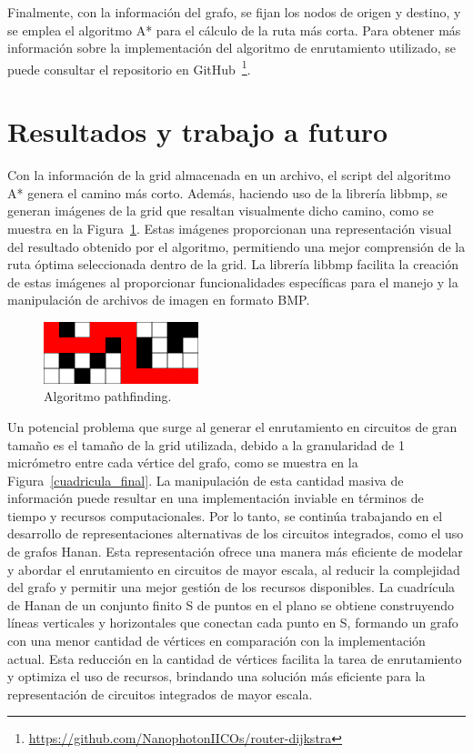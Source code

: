 \documentclass[reprint,amsmath,amssymb,aps]{revtex4-2}
\begin{document}
Finalmente, con la información del grafo, se fijan los nodos de origen y destino, y se emplea el algoritmo A* para el cálculo de la ruta más corta. Para obtener más información sobre la implementación del algoritmo de enrutamiento utilizado, se puede consultar el repositorio en GitHub~\footnote{\url{https://github.com/NanophotonIICOs/router-dijkstra}}.


\section{Resultados y trabajo a futuro}

Con la información de la grid almacenada en un archivo, el script del algoritmo A* genera el camino más corto. Además, haciendo uso de la librería libbmp, se generan imágenes de la grid que resaltan visualmente dicho camino, como se muestra en la Figura~\ref{cuadricula_final2}. Estas imágenes proporcionan una representación visual del resultado obtenido por el algoritmo, permitiendo una mejor comprensión de la ruta óptima seleccionada dentro de la grid. La librería libbmp facilita la creación de estas imágenes al proporcionar funcionalidades específicas para el manejo y la manipulación de archivos de imagen en formato BMP.

\begin{figure}[H]
	\centering
	\includegraphics[width=0.4\textwidth]{cuadricula_final2.png}
	\caption{Algoritmo pathfinding.}
	\label{cuadricula_final2}
\end{figure}

Un potencial problema que surge al generar el enrutamiento en circuitos de gran tamaño es el tamaño de la grid utilizada, debido a la granularidad de 1 micrómetro entre cada vértice del grafo, como se muestra en la Figura~\ref{cuadricula_final}. La manipulación de esta cantidad masiva de información puede resultar en una implementación inviable en términos de tiempo y recursos computacionales. Por lo tanto, se continúa trabajando en el desarrollo de representaciones alternativas de los circuitos integrados, como el uso de grafos Hanan. Esta representación ofrece una manera más eficiente de modelar y abordar el enrutamiento en circuitos de mayor escala, al reducir la complejidad del grafo y permitir una mejor gestión de los recursos disponibles. La cuadrícula de Hanan de un conjunto finito S de puntos en el plano se obtiene construyendo líneas verticales y horizontales que conectan cada punto en S, formando un grafo con una menor cantidad de vértices en comparación con la implementación actual. Esta reducción en la cantidad de vértices facilita la tarea de enrutamiento y optimiza el uso de recursos, brindando una solución más eficiente para la representación de circuitos integrados de mayor escala.
\end{document}
